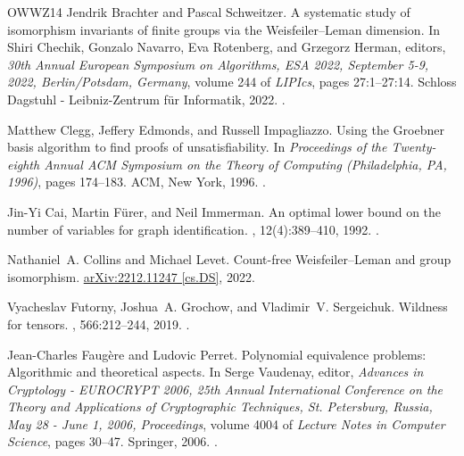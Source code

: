\documentclass[10pt,a4paper]{article}
\theoremstyle{definition}
\begin{document}
\begin{thebibliography}{OWWZ14}
Jendrik Brachter and Pascal Schweitzer.
\newblock A systematic study of isomorphism invariants of finite groups via the
  {Weisfeiler}--{Leman} dimension.
\newblock In Shiri Chechik, Gonzalo Navarro, Eva Rotenberg, and Grzegorz
  Herman, editors, {\em 30th Annual European Symposium on Algorithms, {ESA}
  2022, September 5-9, 2022, Berlin/Potsdam, Germany}, volume 244 of {\em
  LIPIcs}, pages 27:1--27:14. Schloss Dagstuhl - Leibniz-Zentrum f{\"{u}}r
  Informatik, 2022.
\newblock \href {https://doi.org/10.4230/LIPIcs.ESA.2022.27}
  {}.

Matthew Clegg, Jeffery Edmonds, and Russell Impagliazzo.
\newblock Using the {G}roebner basis algorithm to find proofs of
  unsatisfiability.
\newblock In {\em Proceedings of the {T}wenty-eighth {A}nnual {ACM} {S}ymposium
  on the {T}heory of {C}omputing ({P}hiladelphia, {PA}, 1996)}, pages 174--183.
  ACM, New York, 1996.
\newblock \href {https://doi.org/10.1145/237814.237860}
  {}.

Jin-Yi Cai, Martin F\"{u}rer, and Neil Immerman.
\newblock An optimal lower bound on the number of variables for graph
  identification.
, 12(4):389--410, 1992.
\newblock \href {https://doi.org/10.1007/BF01305232}
  {}.

Nathaniel~A. Collins and Michael Levet.
\newblock Count-free {Weisfeiler}--{Leman} and group isomorphism.
\newblock \href{https://arxiv.org/abs/2212.11247}{arXiv:2212.11247 [cs.DS]},
  2022.

Vyacheslav Futorny, Joshua~A. Grochow, and Vladimir~V. Sergeichuk.
\newblock Wildness for tensors.
, 566:212--244, 2019.
\newblock \href {https://doi.org/10.1016/j.laa.2018.12.022}
  {}.

Jean{-}Charles Faug{\`{e}}re and Ludovic Perret.
\newblock Polynomial equivalence problems: Algorithmic and theoretical aspects.
\newblock In Serge Vaudenay, editor, {\em Advances in Cryptology - {EUROCRYPT}
  2006, 25th Annual International Conference on the Theory and Applications of
  Cryptographic Techniques, St. Petersburg, Russia, May 28 - June 1, 2006,
  Proceedings}, volume 4004 of {\em Lecture Notes in Computer Science}, pages
  30--47. Springer, 2006.
\newblock \href {https://doi.org/10.1007/11761679\_3}
  {}.


\end{thebibliography}
\end{document}
